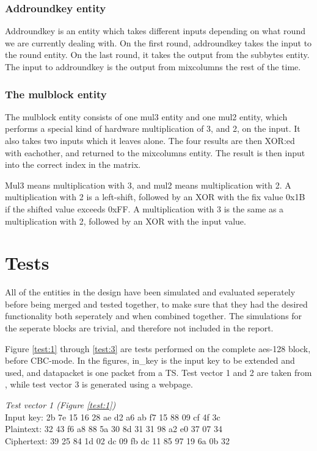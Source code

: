 \subsubsection{Addroundkey entity}
Addroundkey is an entity which takes different inputs depending on 
what round we are currently dealing with. On the first round, 
addroundkey takes the input to the round entity. On the last round, it 
takes the output from the subbytes entity. The input to addroundkey is 
the output from mixcolumns the rest of the time.

\subsubsection{The mulblock entity}
The mulblock entity consists of one mul3 entity and one mul2 entity, 
which performs a special kind of hardware multiplication of 3, and 2, 
on the input. It also takes two inputs which it leaves alone. The four 
results are then XOR:ed with eachother, and returned to the mixcolumns 
entity. The result is then input into the correct index in the matrix. 

Mul3 means multiplication with 3, and mul2 means multiplication with 2. 
A multiplication with 2 is a left-shift, followed by an XOR with the 
fix value 0x1B if the shifted value exceeds 0xFF. A multiplication with 
3 is the same as a multiplication with 2, followed by an XOR with the 
input value.

\section{Tests}
All of the entities in the design have been simulated and evaluated 
seperately before being merged and tested together, to make sure that 
they had the desired functionality both seperately and when combined 
together. The simulations for the seperate blocks are trivial, and 
therefore not included in the report.

Figure \ref{test:1} through \ref{test:3} are tests performed on the 
complete aes-128 block, before CBC-mode. In the figures, in\_key is the 
input key to be extended and used, and datapacket is one packet from a 
TS. Test vector 1 and 2 are taken from \citep{AES:2001}, while test 
vector 3 is generated using a webpage.

\emph{Test vector 1 (Figure \ref{test:1})}\\
Input key: 2b 7e 15 16 28 ae d2 a6 ab f7 15 88 09 cf 4f 3c\\
Plaintext: 32 43 f6 a8 88 5a 30 8d 31 31 98 a2 e0 37 07 34\\
Ciphertext: 39 25 84 1d 02 dc 09 fb dc 11 85 97 19 6a 0b 32

